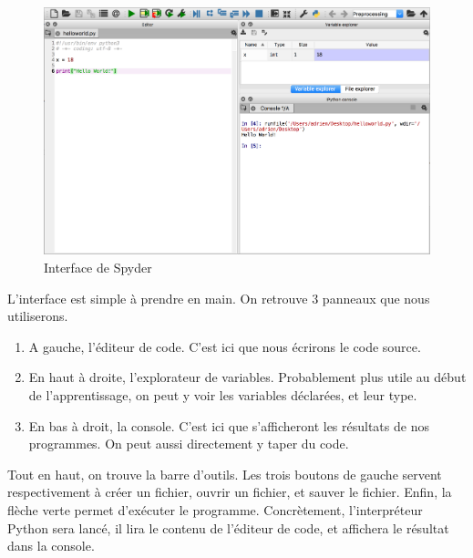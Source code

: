 \begin{figure}[h!]
\begin{center}
\includegraphics[width=15cm]{spyder.png}
\end{center}
\caption{Interface de Spyder}
\label{spyder}
\end{figure}

L'interface est simple à prendre en main. On retrouve 3 panneaux que nous utiliserons.
\begin{enumerate}
    \item A gauche, l'éditeur de code. C'est ici que nous écrirons le code source.
    \item En haut à droite, l'explorateur de variables. Probablement plus utile au début de l'apprentissage, on peut y voir les variables déclarées, et leur type.
    \item En bas à droit, la console. C'est ici que s'afficheront les résultats de nos programmes. On peut aussi directement y taper du code.
\end{enumerate}

Tout en haut, on trouve la barre d'outils. Les trois boutons de gauche servent respectivement à créer un fichier, ouvrir un fichier, et sauver le fichier. Enfin, la flèche verte permet d'exécuter le programme. Concrètement, l'interpréteur Python sera lancé, il lira le contenu de l'éditeur de code, et affichera le résultat dans la console.